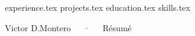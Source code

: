 \documentclass{awesome-cv}
\newcommand*{\sectiondir}{resume/}
\def\myname{Victor D.}
\def\mylastname{Montero}
\def\myfullname{\myname\hspace{1pt}\mylastname}
\begin{document}
\makecvheader

{experience.tex}
{projects.tex}
{education.tex}
{skills.tex}

\makecvfooter
  {}
  {\myfullname~~~·~~~Résumé}
  {}
\end{document}
